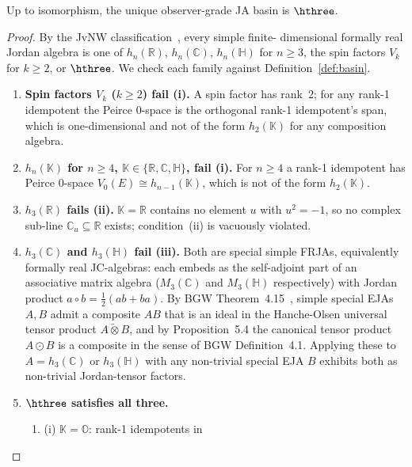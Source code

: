 \begin{theorem}\label{thm:basin}
Up to isomorphism, the unique observer-grade JA basin is $\hthree$.
\end{theorem}

\begin{proof}
By the JvNW classification~\cite{JvNW1934}, every simple finite-
dimensional formally real Jordan algebra is one of $h_n(\mathbb{R})$,
$h_n(\mathbb{C})$, $h_n(\mathbb{H})$ for $n\geq 3$, the spin factors
$V_k$ for $k\geq 2$, or $\hthree$.  We check each family against
Definition~\ref{def:basin}.
\begin{enumerate}
  \item \textbf{Spin factors $V_k$ ($k\geq 2$) fail (i).}
    A spin factor has rank~$2$; for any rank-1 idempotent the
    Peirce 0-space is the orthogonal rank-1 idempotent's span,
    which is one-dimensional and not of the form $h_2(\mathbb{K})$
    for any composition algebra.
  \item \textbf{$h_n(\mathbb{K})$ for $n\geq 4$,
    $\mathbb{K}\in\{\mathbb{R},\mathbb{C},\mathbb{H}\}$, fail (i).}
    For $n\geq 4$ a rank-1 idempotent has Peirce 0-space
    $V_0(E)\cong h_{n-1}(\mathbb{K})$, which is not of the form
    $h_2(\mathbb{K})$.
  \item \textbf{$h_3(\mathbb{R})$ fails (ii).}  $\mathbb{K}=\mathbb{R}$
    contains no element $u$ with $u^2=-1$, so no complex sub-line
    $\mathbb{C}_u\subseteq\mathbb{R}$ exists; condition~(ii) is
    vacuously violated.
  \item \textbf{$h_3(\mathbb{C})$ and $h_3(\mathbb{H})$ fail (iii).}
    Both are special simple FRJAs, equivalently formally real
    JC-algebras: each embeds as the self-adjoint part of an
    associative matrix algebra ($M_3(\mathbb{C})$ and $M_3(\mathbb{H})$
    respectively) with Jordan product $a\circ b=\tfrac12(ab+ba)$.
    By BGW Theorem~4.15~\cite{BGW2020}, simple special EJAs $A,B$
    admit a composite $AB$ that is an ideal in the Hanche-Olsen
    universal tensor product $A\widetilde{\otimes}B$, and by
    Proposition~5.4 the canonical tensor product
    $A\odot B$ is a composite in the sense of BGW Definition~4.1.
    Applying these to $A=h_3(\mathbb{C})$ or $h_3(\mathbb{H})$ with
    any non-trivial special EJA $B$ exhibits both as non-trivial
    Jordan-tensor factors.
  \item \textbf{$\hthree$ satisfies all three.}
    \begin{enumerate}[label=(\alph*)]
      \item (i) $\mathbb{K}=\mathbb{O}$: rank-1 idempotents in

\end{enumerate}
\end{enumerate}
\end{proof}

